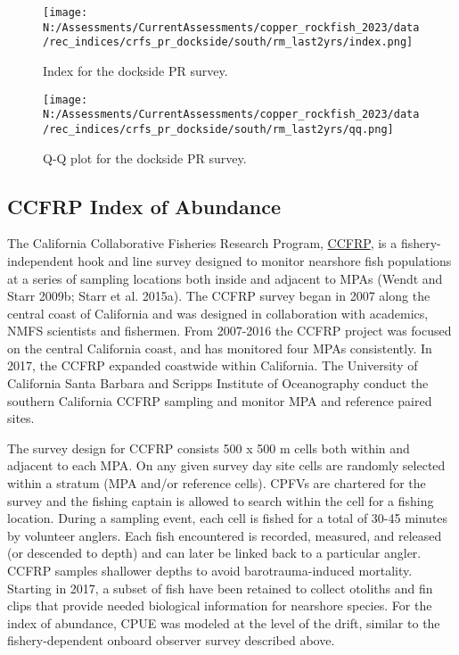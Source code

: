\documentclass[11pt,
  english,
  letterpaper,
]{article}
\begin{document}
\newpage

\begin{figure}
\centering
\texttt{[image: N:/Assessments/CurrentAssessments/copper\_rockfish\_2023/data/rec\_indices/crfs\_pr\_dockside/south/rm\_last2yrs/index.png]}
\caption{Index for the dockside PR survey.\label{fig:pr-index}}
\end{figure}

\newpage

\begin{figure}
\centering
\texttt{[image: N:/Assessments/CurrentAssessments/copper\_rockfish\_2023/data/rec\_indices/crfs\_pr\_dockside/south/rm\_last2yrs/qq.png]}
\caption{Q-Q plot for the dockside PR survey.\label{fig:pr-qq}}
\end{figure}

\newpage

\hypertarget{ccfrp-index}{%
\subsection{CCFRP Index of Abundance}\label{ccfrp-index}}

The California Collaborative Fisheries Research Program, \href{https://www.mlml.calstate.edu/ccfrp/}{CCFRP}, is a fishery-independent hook and line survey designed to monitor nearshore fish populations at a series of sampling locations both inside and adjacent to MPAs (Wendt and Starr 2009b; Starr et al. 2015a). The CCFRP survey began in 2007 along the central coast of California and was designed in collaboration with academics, NMFS scientists and fishermen. From 2007-2016 the CCFRP project was focused on the central California coast, and has monitored four MPAs consistently. In 2017, the CCFRP expanded coastwide within California. The University of California Santa Barbara and Scripps Institute of Oceanography conduct the southern California CCFRP sampling and monitor MPA and reference paired sites.

The survey design for CCFRP consists 500 x 500 m cells both within and adjacent to each MPA. On any given survey day site cells are randomly selected within a stratum (MPA and/or reference cells). CPFVs are chartered for the survey and the fishing captain is allowed to search within the cell for a fishing location. During a sampling event, each cell is fished for a total of 30-45 minutes by volunteer anglers. Each fish encountered is recorded, measured, and released (or descended to depth) and can later be linked back to a particular angler. CCFRP samples shallower depths to avoid barotrauma-induced mortality. Starting in 2017, a subset of fish have been retained to collect otoliths and fin clips that provide needed biological information for nearshore species. For the index of abundance, CPUE was modeled at the level of the drift, similar to the fishery-dependent onboard observer survey described above.
\end{document}
